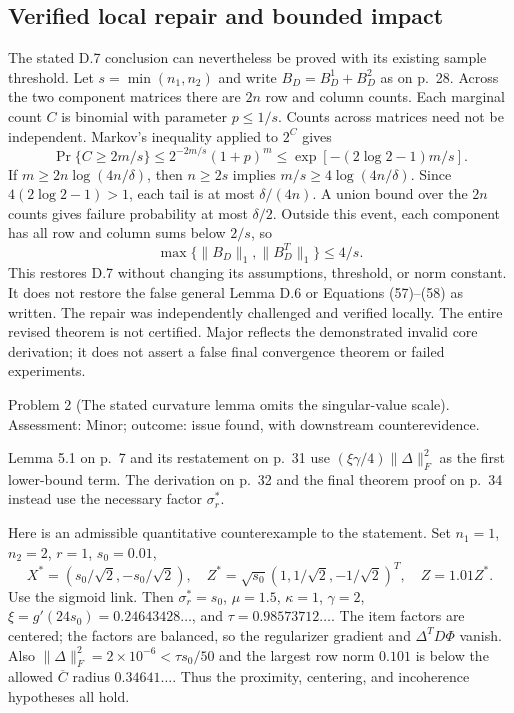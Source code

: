 \documentclass[10pt]{article}
\begin{document}
\subsection*{Verified local repair and bounded impact}
The stated D.7 conclusion can nevertheless be proved with its existing sample threshold. Let \(s=\min(n_1,n_2)\) and write \(B_D=B_D^1+B_D^2\) as on p. 28. Across the two component matrices there are \(2n\) row and column counts. Each marginal count \(C\) is binomial with parameter \(p\le1/s\). Counts across matrices need not be independent. Markov’s inequality applied to \(2^C\) gives \[\Pr\{C\ge2m/s\}
 \le2^{-2m/s}(1+p)^m
 \le\exp[-(2\log2-1)m/s].\] If \(m\ge2n\log(4n/\delta)\), then \(n\ge2s\) implies \(m/s\ge4\log(4n/\delta)\). Since \(4(2\log2-1)>1\), each tail is at most \(\delta/(4n)\). A union bound over the \(2n\) counts gives failure probability at most \(\delta/2\). Outside this event, each component has all row and column sums below \(2/s\), so \[\max\{\|B_D\|_1,\|B_D^T\|_1\}\le4/s.\] This restores D.7 without changing its assumptions, threshold, or norm constant. It does not restore the false general Lemma D.6 or Equations (57)–(58) as written. The repair was independently challenged and verified locally. The entire revised theorem is not certified. Major reflects the demonstrated invalid core derivation; it does not assert a false final convergence theorem or failed experiments.\par
Problem 2 (The stated curvature lemma omits the singular-value scale).  Assessment: Minor; outcome: issue found, with downstream counterevidence.\par
Lemma 5.1 on p. 7 and its restatement on p. 31 use \((\xi\gamma/4)\|\Delta\|_F^2\) as the first lower-bound term. The derivation on p. 32 and the final theorem proof on p. 34 instead use the necessary factor \(\sigma_r^*\).\par
Here is an admissible quantitative counterexample to the statement. Set \(n_1=1\), \(n_2=2\), \(r=1\), \(s_0=0.01\), \[X^*=(s_0/\sqrt2,-s_0/\sqrt2),\quad
 Z^*=\sqrt{s_0}(1,1/\sqrt2,-1/\sqrt2)^T,\quad
 Z=1.01Z^*.\] Use the sigmoid link. Then \(\sigma_r^*=s_0\), \(\mu=1.5\), \(\kappa=1\), \(\gamma=2\), \(\xi=g'(24s_0)=0.24643428\ldots\), and \(\tau=0.98573712\ldots\). The item factors are centered; the factors are balanced, so the regularizer gradient and \(\Delta^TD\Phi\) vanish. Also \(\|\Delta\|_F^2=2\times10^{-6}<\tau s_0/50\) and the largest row norm \(0.101\) is below the allowed \(\overline C\) radius \(0.34641\ldots\). Thus the proximity, centering, and incoherence hypotheses all hold.\par
\end{document}
